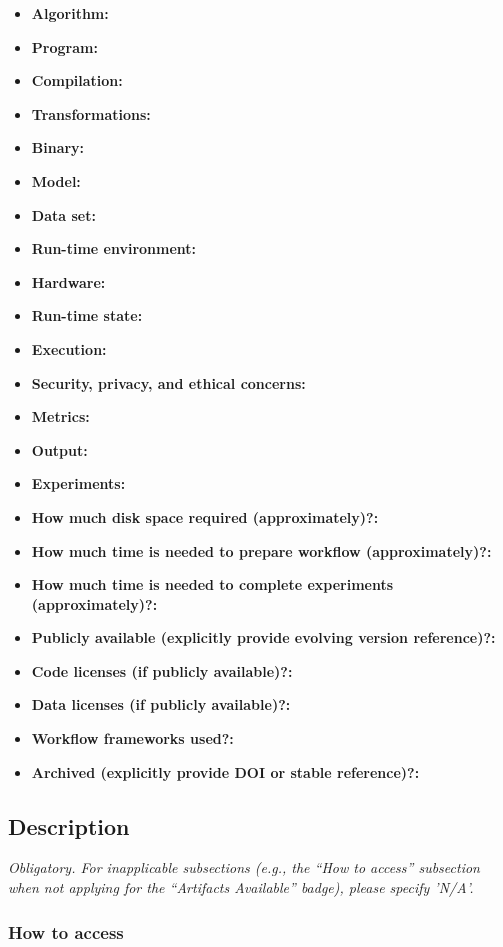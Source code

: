 \documentclass[letterpaper,twocolumn,10pt]{article}
\begin{document}
{\small
\begin{itemize}
  \item {\bf Algorithm: }
  \item {\bf Program: }
  \item {\bf Compilation: }
  \item {\bf Transformations: }
  \item {\bf Binary: }
  \item {\bf Model: }
  \item {\bf Data set: }
  \item {\bf Run-time environment: }
  \item {\bf Hardware: }
  \item {\bf Run-time state: }
  \item {\bf Execution: }
  \item {\bf Security, privacy, and ethical concerns: }
  \item {\bf Metrics: }
  \item {\bf Output: }
  \item {\bf Experiments: }
  \item {\bf How much disk space required (approximately)?: }
  \item {\bf How much time is needed to prepare workflow (approximately)?: }
  \item {\bf How much time is needed to complete experiments (approximately)?: }
  \item {\bf Publicly available (explicitly provide evolving version reference)?: }
  \item {\bf Code licenses (if publicly available)?: }
  \item {\bf Data licenses (if publicly available)?: }
  \item {\bf Workflow frameworks used?: }
  \item {\bf Archived (explicitly provide DOI or stable reference)?: }
\end{itemize}

\subsection{Description}

{\em Obligatory. For inapplicable subsections (e.g., the ``How to access'' subsection when not applying for the ``Artifacts Available'' badge), please specify 'N/A'.}

\subsubsection{How to access}

}
\end{document}
